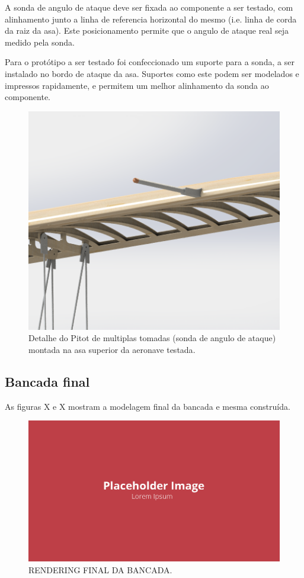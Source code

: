 A sonda de angulo de ataque deve ser fixada ao componente a ser testado, com alinhamento junto a linha de referencia horizontal do mesmo (i.e. linha de corda da raiz da asa). Este posicionamento permite que o angulo de ataque real seja medido pela sonda. 

Para o protótipo a ser testado foi confeccionado um suporte para a sonda, a ser instalado no bordo de ataque da asa. Suportes como este podem ser modelados e impressos rapidamente, e permitem um melhor alinhamento da sonda ao componente.

\begin{figure}[!ht]
    \centering
    \includegraphics[width=.8\linewidth]{figuras/renders/sonda_aoa_asa_superior.png}
    \caption{Detalhe do Pitot de multiplas tomadas (sonda de angulo de ataque) montada na asa superior da aeronave testada\cite{autor}.}
    \label{fig:placeholder}
\end{figure}

\subsection{Bancada final}

As figuras X e X mostram a modelagem final da bancada e mesma construída.

\begin{figure}[!ht]
    \centering
    \includegraphics[width=.8\linewidth]{figuras/outras/placeholder.png}
    \caption{RENDERING FINAL DA BANCADA\cite{autor}.}
    \label{fig:placeholder}
\end{figure}


